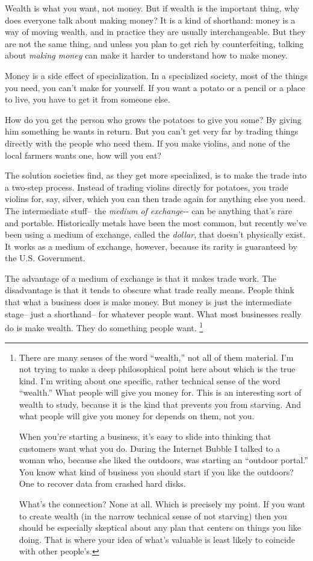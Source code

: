 \documentclass[12pt]{book}
\begin{document}
Wealth is what you want, not money. But if wealth is the important
thing, why does everyone talk about making money? It is a kind of
shorthand: money is a way of moving wealth, and in practice they are
usually interchangeable. But they are not the same thing, and unless you
plan to get rich by counterfeiting, talking about \emph{making money}
can make it harder to understand how to make money.

Money is a side effect of specialization. In a specialized society, most
of the things you need, you can't make for yourself. If you want a
potato or a pencil or a place to live, you have to get it from someone
else.

How do you get the person who grows the potatoes to give you some? By
giving him something he wants in return. But you can't get very far by
trading things directly with the people who need them. If you make
violins, and none of the local farmers wants one, how will you eat?

The solution societies find, as they get more specialized, is to make
the trade into a two-step process. Instead of trading violins directly
for potatoes, you trade violins for, say, silver, which you can then
trade again for anything else you need. The intermediate stuff-- the
\emph{medium of exchange}-\/- can be anything that's rare and portable.
Historically metals have been the most common, but recently we've been
using a medium of exchange, called the \emph{dollar}, that doesn't
physically exist. It works as a medium of exchange, however, because its
rarity is guaranteed by the U.S. Government.

The advantage of a medium of exchange is that it makes trade work. The
disadvantage is that it tends to obscure what trade really means. People
think that what a business does is make money. But money is just the
intermediate stage-- just a shorthand-- for whatever people want. What
most businesses really do is make wealth. They do something people want.
\footnote{There are many senses of the word ``wealth,'' not all of them
material. I'm not trying to make a deep philosophical point here about
which is the true kind. I'm writing about one specific, rather technical
sense of the word ``wealth.'' What people will give you money for. This
is an interesting sort of wealth to study, because it is the kind that
prevents you from starving. And what people will give you money for
depends on them, not you.

When you're starting a business, it's easy to slide into thinking that
customers want what you do. During the Internet Bubble I talked to a
woman who, because she liked the outdoors, was starting an ``outdoor
portal.'' You know what kind of business you should start if you like
the outdoors? One to recover data from crashed hard disks.

What's the connection? None at all. Which is precisely my point. If you
want to create wealth (in the narrow technical sense of not starving)
then you should be especially skeptical about any plan that centers on
things you like doing. That is where your idea of what's valuable is
least likely to coincide with other people's.}
\end{document}
